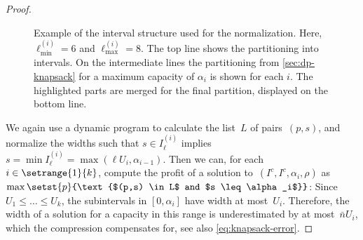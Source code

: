 \begin{proof}
\begin{figure*}
    \caption{Example of the interval structure used for the normalization.
    Here, $\ell^{(i)}_{\min} = 6$ and $\ell^{(i)}_{\max} = 8$.
    The top line shows the partitioning into intervals.
    On the intermediate lines the partitioning from \cref{sec:dp-knapsack}
    for a maximum capacity of $\alpha_i$ is shown for each $i$.
    The highlighted parts are merged for the final partition,
    displayed on the bottom line.}
    \label{fig:adaptive-rounding}
  \end{figure*}
  We again use a dynamic program to calculate the list~$L$ of pairs~$(p, s)$,
  and normalize the widths such that $s \in I^{(i)}_{\ell}$
  implies~$s = \min I^{(i)}_{\ell} = \max(\ell U_i, \alpha_{i-1})$.
  Then we can, for each $i \in \setrange{1}{k}$, compute the profit of a solution
  to~$(I^c, I^c, \alpha_i, \rho)$ as~$\max \setst{p}{\text{$(p,s) \in L$ and $s \leq \alpha_i$}}$:
  Since $U_1 \leq \dots \leq U_k$, the subintervals in $[0, \alpha_i]$ have width at most~$U_i$.
  Therefore, the width of a solution for a capacity in this range
  is underestimated by at most~$\bar{n} U_i$,
  which the compression compensates for, see also \cref{eq:knapsack-error}.
  

\end{proof}
